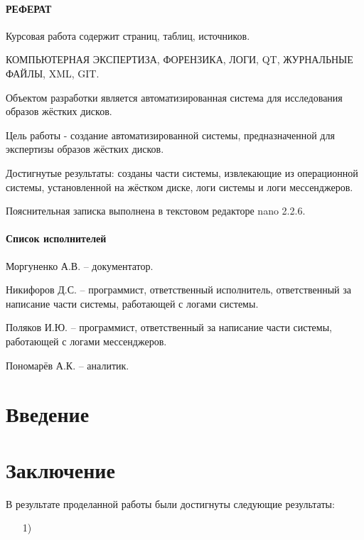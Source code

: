 \documentclass[russian,utf8,14pt,simple]{eskdtext}
\begin{document}
\newpage
{}
\paragraph{\hfill РЕФЕРАТ \hfill}
Курсовая работа содержит  страниц,  таблиц,  источников.

КОМПЬЮТЕРНАЯ ЭКСПЕРТИЗА, ФОРЕНЗИКА, ЛОГИ, QT, ЖУРНАЛЬНЫЕ ФАЙЛЫ, XML, GIT.

Объектом разработки является автоматизированная система для исследования образов жёстких дисков.

Цель работы - создание автоматизированной системы, предназначенной для экспертизы образов жёстких дисков.

Достигнутые результаты: созданы части системы, извлекающие из операционной системы, установленной на жёстком диске, логи системы и логи мессенджеров.

Пояснительная записка выполнена в текстовом редакторе nano 2.2.6.

\newpage
{}
\paragraph{\hfill Список исполнителей \hfill}
Моргуненко А.В. -- документатор.

Никифоров Д.С. -- программист, ответственный исполнитель, ответственный за написание части системы, работающей с логами системы.

Поляков И.Ю. -- программист, ответственный за написание части системы, работающей с логами мессенджеров.

Пономарёв А.К. -- аналитик.

\newpage
{}
\renewcommand\contentsname{\hfill Содержание \hfill}
\tableofcontents

\newpage
{}
\section{Введение}

\newpage
\section{}
\subsection{}

\section{Заключение}
В результате проделанной работы были достигнуты следующие результаты:
\begin{enumerate}
\item[1)]
\end{enumerate}
\end{document}
